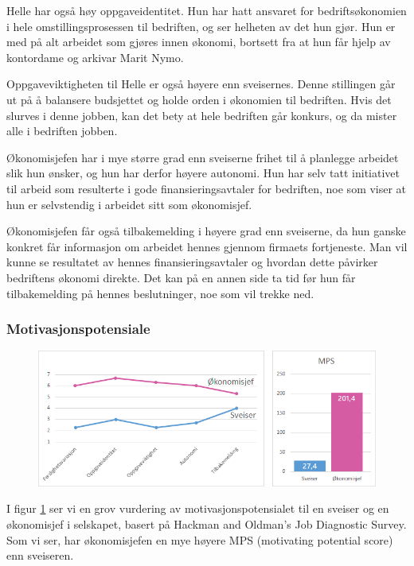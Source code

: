 Helle har også høy oppgaveidentitet. Hun har hatt ansvaret for bedriftsøkonomien i hele omstillingsprosessen til bedriften, og ser helheten av det hun gjør. Hun er med på alt arbeidet som gjøres innen økonomi, bortsett fra at hun får hjelp av kontordame og arkivar Marit Nymo.

Oppgaveviktigheten til Helle er også høyere enn sveisernes. Denne stillingen går ut på å balansere budsjettet og holde orden i økonomien til bedriften. Hvis det slurves i denne jobben, kan det bety at hele bedriften går konkurs, og da mister alle i bedriften jobben.

Økonomisjefen har i mye større grad enn sveiserne frihet til å planlegge arbeidet slik hun ønsker, og hun har derfor høyere autonomi. Hun har selv tatt initiativet til arbeid som resulterte i gode finansieringsavtaler for bedriften, noe som viser at hun er selvstendig i arbeidet sitt som økonomisjef.

Økonomisjefen får også tilbakemelding i høyere grad enn sveiserne, da hun ganske konkret får informasjon om arbeidet hennes gjennom firmaets fortjeneste. Man vil kunne se resultatet av hennes finansieringsavtaler og hvordan dette påvirker bedriftens økonomi direkte. Det kan på en annen side ta tid før hun får tilbakemelding på hennes beslutninger, noe som vil trekke ned.

\subsubsection{Motivasjonspotensiale}
\begin{figure}[ht!]
    \centering
    \includegraphics[width=135mm]{mps.png}
    \label{fig:mps}
\end{figure}
I figur \ref{fig:mps} ser vi en grov vurdering av motivasjonspotensialet til en sveiser og en økonomisjef i selskapet, basert på Hackman and Oldman’s Job Diagnostic Survey. Som vi ser, har økonomisjefen en mye høyere MPS (motivating potential score) enn sveiseren.


